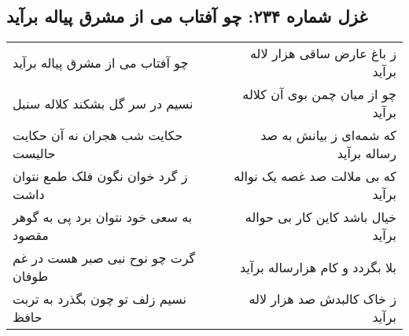 \begin{center}
\section*{غزل شماره ۲۳۴: چو آفتاب می از مشرق پیاله برآید}
\label{sec:sh234}
\begin{longtable}{l p{0.5cm} r}
چو آفتاب می از مشرق پیاله برآید
&&
ز باغ عارض ساقی هزار لاله برآید
\\
نسیم در سر گل بشکند کلاله سنبل
&&
چو از میان چمن بوی آن کلاله برآید
\\
حکایت شب هجران نه آن حکایت حالیست
&&
که شمه‌ای ز بیانش به صد رساله برآید
\\
ز گرد خوان نگون فلک طمع نتوان داشت
&&
که بی ملالت صد غصه یک نواله برآید
\\
به سعی خود نتوان برد پی به گوهر مقصود
&&
خیال باشد کاین کار بی حواله برآید
\\
گرت چو نوح نبی صبر هست در غم طوفان
&&
بلا بگردد و کام هزارساله برآید
\\
نسیم زلف تو چون بگذرد به تربت حافظ
&&
ز خاک کالبدش صد هزار لاله برآید
\\
\end{longtable}
\end{center}
